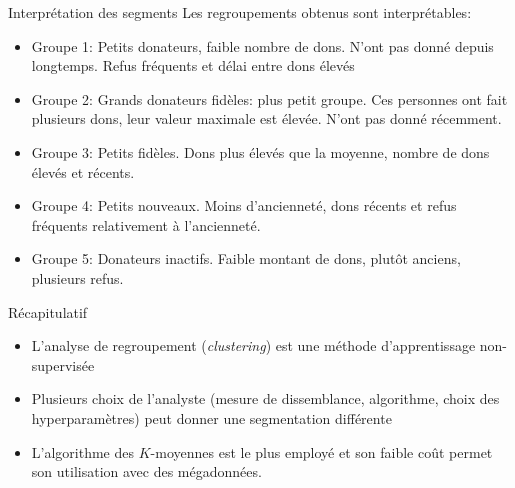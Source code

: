 \documentclass[
  ignorenonframetext,
]{beamer}
\providecommand{\tightlist}{%
  \setlength{\itemsep}{0pt}\setlength{\parskip}{0pt}}\usepackage{longtable,booktabs,array}
\begin{document}
\begin{frame}{Interprétation des segments}
\protect\hypertarget{interpruxe9tation-des-segments}{}
Les regroupements obtenus sont interprétables:

\begin{itemize}
\tightlist
\item
  Groupe 1: Petits donateurs, faible nombre de dons. N'ont pas donné
  depuis longtemps. Refus fréquents et délai entre dons élevés
\item
  Groupe 2: Grands donateurs fidèles: plus petit groupe. Ces personnes
  ont fait plusieurs dons, leur valeur maximale est élevée. N'ont pas
  donné récemment.
\item
  Groupe 3: Petits fidèles. Dons plus élevés que la moyenne, nombre de
  dons élevés et récents.
\item
  Groupe 4: Petits nouveaux. Moins d'ancienneté, dons récents et refus
  fréquents relativement à l'ancienneté.
\item
  Groupe 5: Donateurs inactifs. Faible montant de dons, plutôt anciens,
  plusieurs refus.
\end{itemize}
\end{frame}

\begin{frame}{Récapitulatif}
\protect\hypertarget{ruxe9capitulatif}{}
\begin{itemize}
\tightlist
\item
  L'analyse de regroupement (\emph{clustering}) est une méthode
  d'apprentissage non-supervisée
\item
  Plusieurs choix de l'analyste (mesure de dissemblance, algorithme,
  choix des hyperparamètres) peut donner une segmentation différente
\item
  L'algorithme des \(K\)-moyennes est le plus employé et son faible coût
  permet son utilisation avec des mégadonnées.
\end{itemize}
\end{frame}
\end{document}
